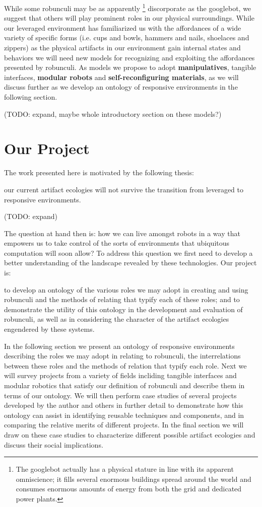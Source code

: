 While some robunculi may be as apparently%
\footnote{The googlebot actually has a physical stature in line with its apparent omniscience; it fills several enormous buildings spread around the world and consumes enormous amounts of energy from both the grid and dedicated power plants.}
discorporate as the googlebot, we suggest that others will play prominent roles in our physical surroundings. While our leveraged environment has familiarized us with the affordances of a wide variety of specific forms (i.e. cups and bowls, hammers and nails, shoelaces and zippers) as the physical artifacts in our environment gain internal states and behaviors we will need new models for recognizing and exploiting the affordances presented by robunculi. As models we propose to adopt \textbf{manipulatives}, tangible interfaces, \textbf{modular robots} and \textbf{self-reconfiguring materials}, as we will discuss further as we develop an ontology of responsive environments in the following section.

(TODO: expand, maybe whole introductory section on these models?)

\section{Our Project}
%
The work presented here is motivated by the following thesis:
\begin{em}
our current artifact ecologies will not survive the transition from leveraged to responsive environments.
\end{em}

(TODO: expand)

The question at hand then is: how we can live amongst robots in a way that empowers us to take control of the sorts of environments that ubiquitous computation will soon allow? To address this question we first need to develop a better understanding of the landscape revealed by these technologies. Our project is:
\begin{em}
to develop an ontology of the various roles we may adopt in creating and using robunculi and the methods of relating that typify each of these roles; and to demonstrate the utility of this ontology in the development and evaluation of robunculi, as well as in considering the character of the artifact ecologies engendered by these systems.
\end{em}

In the following section we present an ontology of responsive environments describing the roles we may adopt in relating to robunculi, the interrelations between these roles and the methods of relation that typify each role. Next we will survey projects from a variety of fields incliding tangible interfaces and modular robotics that satisfy our definition of robunculi and describe them in terms of our ontology. We will then perform case studies of several projects developed by the author and others in further detail to demonstrate how this ontology can assist in identifying reusable techniques and components, and in comparing the relative merits of different projects. In the final section we will draw on these case studies to characterize different possible artifact ecologies and discuss their social implications.




